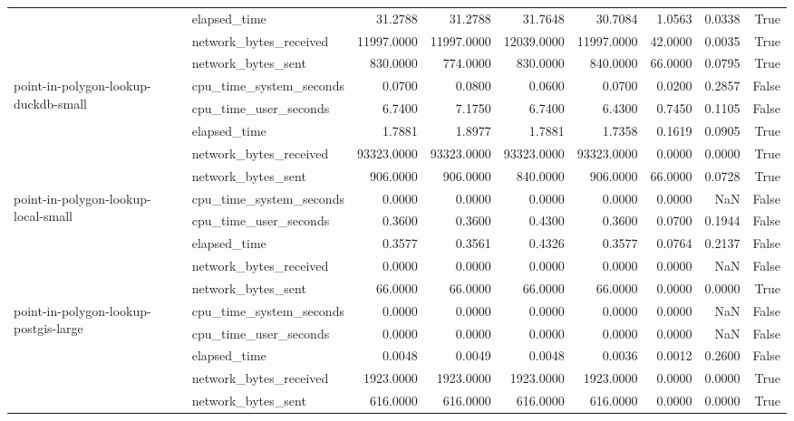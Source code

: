 \begin{tabular}{llrrrrrrr}
 & elapsed\_time & 31.2788 & 31.2788 & 31.7648 & 30.7084 & 1.0563 & 0.0338 & True \\
 & network\_bytes\_received & 11997.0000 & 11997.0000 & 12039.0000 & 11997.0000 & 42.0000 & 0.0035 & True \\
 & network\_bytes\_sent & 830.0000 & 774.0000 & 830.0000 & 840.0000 & 66.0000 & 0.0795 & True \\
\cline{1-9}
\multirow[t]{5}{*}{point-in-polygon-lookup-duckdb-small} & cpu\_time\_system\_seconds & 0.0700 & 0.0800 & 0.0600 & 0.0700 & 0.0200 & 0.2857 & False \\
 & cpu\_time\_user\_seconds & 6.7400 & 7.1750 & 6.7400 & 6.4300 & 0.7450 & 0.1105 & False \\
 & elapsed\_time & 1.7881 & 1.8977 & 1.7881 & 1.7358 & 0.1619 & 0.0905 & True \\
 & network\_bytes\_received & 93323.0000 & 93323.0000 & 93323.0000 & 93323.0000 & 0.0000 & 0.0000 & True \\
 & network\_bytes\_sent & 906.0000 & 906.0000 & 840.0000 & 906.0000 & 66.0000 & 0.0728 & True \\
\cline{1-9}
\multirow[t]{5}{*}{point-in-polygon-lookup-local-small} & cpu\_time\_system\_seconds & 0.0000 & 0.0000 & 0.0000 & 0.0000 & 0.0000 & NaN & False \\
 & cpu\_time\_user\_seconds & 0.3600 & 0.3600 & 0.4300 & 0.3600 & 0.0700 & 0.1944 & False \\
 & elapsed\_time & 0.3577 & 0.3561 & 0.4326 & 0.3577 & 0.0764 & 0.2137 & False \\
 & network\_bytes\_received & 0.0000 & 0.0000 & 0.0000 & 0.0000 & 0.0000 & NaN & False \\
 & network\_bytes\_sent & 66.0000 & 66.0000 & 66.0000 & 66.0000 & 0.0000 & 0.0000 & True \\
\cline{1-9}
\multirow[t]{5}{*}{point-in-polygon-lookup-postgis-large} & cpu\_time\_system\_seconds & 0.0000 & 0.0000 & 0.0000 & 0.0000 & 0.0000 & NaN & False \\
 & cpu\_time\_user\_seconds & 0.0000 & 0.0000 & 0.0000 & 0.0000 & 0.0000 & NaN & False \\
 & elapsed\_time & 0.0048 & 0.0049 & 0.0048 & 0.0036 & 0.0012 & 0.2600 & False \\
 & network\_bytes\_received & 1923.0000 & 1923.0000 & 1923.0000 & 1923.0000 & 0.0000 & 0.0000 & True \\
 & network\_bytes\_sent & 616.0000 & 616.0000 & 616.0000 & 616.0000 & 0.0000 & 0.0000 & True \\

\end{tabular}
